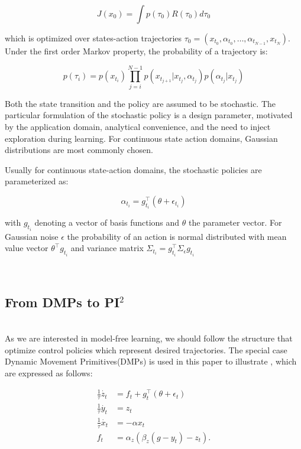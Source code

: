 \documentclass[journal]{IEEEtran}
\begin{document}
\begin{equation}
  J(x_0) = \int p(\tau_0)R(\tau_0)d\tau_0
\end{equation}

which is optimized over states-action trajectories $\tau_0 = (x_{t_0}, \alpha_{t_0}, \ldots, \alpha_{t_{N-1}} ,x_{t_N})$. Under the first order Markov
property, the probability of a trajectory is:

\begin{equation}
  p(\tau_i)=p(x_{t_i} )\prod_{j = i}^{N-1} p(x_{t_{j+1}} |x_{t_j} ,\alpha_{t_j} )p(\alpha_{t_j} |x_{t_j} )
\end{equation}

Both the state transition and the policy are assumed to be stochastic. The particular formulation of the stochastic policy is a design parameter, motivated by the application domain, 
analytical convenience, and the need to inject exploration during learning. For continuous state action domains, Gaussian distributions are most commonly chosen.

Usually for continuous state-action domains, the stochastic policies are parameterized as:

\begin{equation}
   \alpha_{t_i} = g_{t_i}^{\top} (\theta + \epsilon_{t_i})
\end{equation}

with $g_{t_i}$ denoting a vector of basis functions and $\theta$ the parameter vector. For Gaussian noise $\epsilon$ the probability of an action is normal distributed with mean value vector $\theta^{\top} g_{t_i}$ and variance matrix $\Sigma_{t_i} = g_{t_i}^{\top} \Sigma_{\epsilon} g_{t_i}$

\ \\
\subsection{From DMPs to PI$^2$}
\ \\
As we are interested in model-free learning, we should follow the structure that optimize control policies which represent desired trajectories. 
The special case  Dynamic Movement Primitives(DMPs) is used in this paper to illustrate , which are expressed as follows:

\begin{equation}
  \begin{aligned}
     \frac{1}{\tau} \dot{z_t} & = f_t + g_t^{\top}(\theta + \epsilon_t) \\
     \frac{1}{\tau} \dot{y_t} & = z_t \\
     \frac{1}{\tau} \dot{x_t} & = -\alpha x_t \\ 
     f_t & = \alpha_z(\beta_z(g-y_t)- z_t).  \nonumber
  \end{aligned}
  \label{DMPs}
\end{equation}
\end{document}
